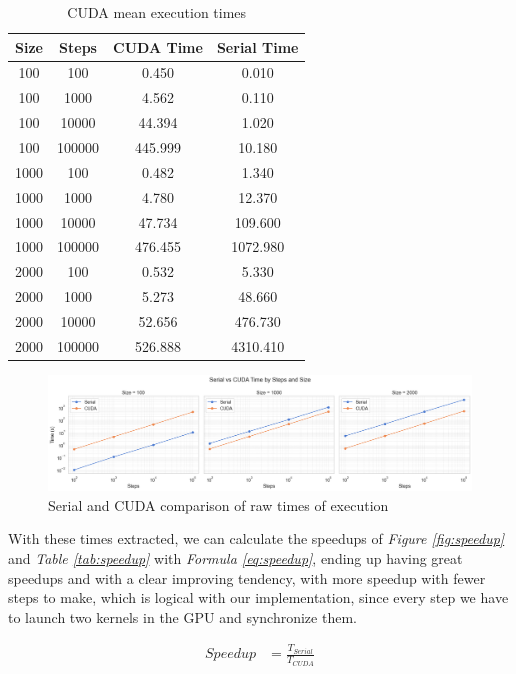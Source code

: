 \documentclass[../main.tex]{subfiles}
\begin{document}
\begin{table}[!ht]
    \centering
\begin{tabular}{|c|c|c|c|}
\hline
Size & Steps  & CUDA Time    & Serial Time \\ \hline
100  & 100    & 0.450   & 0.010       \\
100  & 1000   & 4.562   & 0.110       \\
100  & 10000  & 44.394  & 1.020       \\
100  & 100000 & 445.999 & 10.180      \\ \hline
1000 & 100    & 0.482   & 1.340       \\
1000 & 1000   & 4.780   & 12.370      \\
1000 & 10000  & 47.734  & 109.600     \\
1000 & 100000 & 476.455 & 1072.980    \\ \hline
2000 & 100    & 0.532   & 5.330       \\
2000 & 1000   & 5.273   & 48.660      \\
2000 & 10000  & 52.656  & 476.730     \\
2000 & 100000 & 526.888 & 4310.410    \\ \hline
\end{tabular}
\caption{CUDA mean execution times}
\label{tab:cuda-times}
\end{table}

\begin{figure}[!ht]
    \centering
    \includegraphics[width=0.9\linewidth]{media/images/serial-vs-cuda.png}
    \caption{Serial and CUDA comparison of raw times of execution}
    \label{fig:serial-vs-cuda}
\end{figure}

With these times extracted, we can calculate the speedups of \textit{Figure \ref{fig:speedup}} and \textit{Table \ref{tab:speedup}} with \textit{Formula \ref{eq:speedup}}, ending up having great speedups and with a clear improving tendency, with more speedup with fewer steps to make, which is logical with our implementation, since every step we have to launch two kernels in the GPU and synchronize them. 

\begin{equation}
    \begin{split}
        Speedup&=\frac{T_{Serial}}{T_{CUDA}}
    \end{split}
    \label{eq:speedup}
\end{equation}
\end{document}
